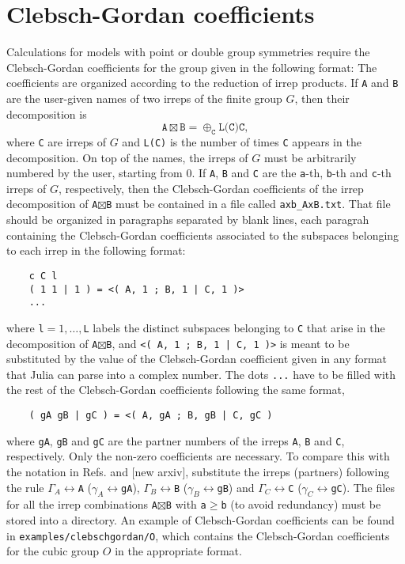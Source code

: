 \documentclass[notitlepage]{article}
\begin{document}
\section{Clebsch-Gordan coefficients}\label{clebsch-gordan}
Calculations for models with point or double group
symmetries require the Clebsch-Gordan coefficients for the
group given in the following format: The coefficients are
organized according to the reduction of irrep products. If
\texttt{A} and \texttt{B} are the user-given names of two
irreps of the finite group $G$, then their decomposition is
\begin{equation}
    \texttt{A} \boxtimes \texttt{B}
    =
    \oplus_\texttt{C} \texttt{L(C)} \texttt{C},
\label{eq:A_times_B}
\end{equation}
where \texttt{C} are irreps of $G$ and \texttt{L(C)} is the
number of times \texttt{C} appears in the decomposition. On
top of the names, the irreps of $G$ must be arbitrarily
numbered by the user, starting from 0. If \texttt{A},
\texttt{B} and \texttt{C} are the \texttt{a}-th,
\texttt{b}-th and \texttt{c}-th irreps of $G$, respectively,
then the Clebsch-Gordan coefficients of the irrep
decomposition of \texttt{A}$\boxtimes$\texttt{B} must be
contained in a file called \texttt{axb\_AxB.txt}. That file
should be organized in paragraphs separated by blank lines,
each paragrah containing the Clebsch-Gordan coefficients
associated to the subspaces belonging to each irrep in the
following format:
\begin{verbatim}
    c C l
    ( 1 1 | 1 ) = <( A, 1 ; B, 1 | C, 1 )>
    ...
\end{verbatim}
where \texttt{l}$=1,\dots,$\texttt{L} labels the distinct
subspaces belonging to \texttt{C} that arise in the
decomposition of \texttt{A}$\boxtimes$\texttt{B},  and
\texttt{<( A, 1 ; B, 1 | C, 1 )>} is meant to be substituted by
the value of the Clebsch-Gordan coefficient given in any
format that Julia can parse into a complex number. The dots
\texttt{...} have to be filled with the rest of the
Clebsch-Gordan coefficients following the same format,
\begin{verbatim}
    ( gA gB | gC ) = <( A, gA ; B, gB | C, gC )
\end{verbatim}
where \texttt{gA}, \texttt{gB} and \texttt{gC} are the
partner numbers of the irreps \texttt{A}, \texttt{B} and
\texttt{C}, respectively. Only the non-zero coefficients are
necessary. To compare this with the notation in Refs.
\cite{calvo-fernandez2024} and [new arxiv], substitute the
irreps (partners) following the rule
$\Gamma_A\leftrightarrow$\texttt{A}
($\gamma_A\leftrightarrow$\texttt{gA}),
$\Gamma_B\leftrightarrow$\texttt{B}
($\gamma_B\leftrightarrow$\texttt{gB}) and
$\Gamma_C\leftrightarrow$\texttt{C}
($\gamma_C\leftrightarrow$\texttt{gC}). The files for all
the irrep combinations \texttt{A}$\boxtimes$\texttt{B} with
\texttt{a}$\geq$\texttt{b} (to avoid redundancy) must be
stored into a directory. An example of Clebsch-Gordan
coefficients can be found in
\texttt{examples/clebschgordan/O}, which contains the
Clebsch-Gordan coefficients for the cubic group $O$ in the
appropriate format.
\end{document}
